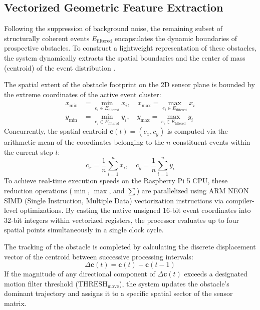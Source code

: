 \documentclass[conference]{IEEEtran}
\begin{document}
\subsection{Vectorized Geometric Feature Extraction}
Following the suppression of background noise, the remaining subset of structurally coherent events $E_{\text{filtered}}$ encapsulates the dynamic boundaries of prospective obstacles. To construct a lightweight representation of these obstacles, the system dynamically extracts the spatial boundaries and the center of mass (centroid) of the event distribution \cite{b14}.

The spatial extent of the obstacle footprint on the 2D sensor plane is bounded by the extreme coordinates of the active event cluster:
\begin{align}
    x_{\min} &= \min_{e_i \in E_{\text{filtered}}} x_i, \quad x_{\max} = \max_{e_i \in E_{\text{filtered}}} x_i \\
    y_{\min} &= \min_{e_i \in E_{\text{filtered}}} y_i, \quad y_{\max} = \max_{e_i \in E_{\text{filtered}}} y_i
\end{align}
Concurrently, the spatial centroid $\mathbf{c}(t) = (c_x, c_y)$ is computed via the arithmetic mean of the coordinates belonging to the $n$ constituent events within the current step $t$:
\begin{equation}
    c_x = \frac{1}{n} \sum_{i=1}^{n} x_i, \quad c_y = \frac{1}{n} \sum_{i=1}^{n} y_i
\end{equation}
To achieve real-time execution speeds on the Raspberry Pi 5 CPU, these reduction operations ($\min$, $\max$, and $\sum$) are parallelized using ARM NEON SIMD (Single Instruction, Multiple Data) vectorization instructions via compiler-level optimizations. By casting the native unsigned 16-bit event coordinates into 32-bit integers within vectorized registers, the processor evaluates up to four spatial points simultaneously in a single clock cycle. 

The tracking of the obstacle is completed by calculating the discrete displacement vector of the centroid between successive processing intervals:
\begin{equation}
    \Delta \mathbf{c}(t) = \mathbf{c}(t) - \mathbf{c}(t-1)
\end{equation}
If the magnitude of any directional component of $\Delta \mathbf{c}(t)$ exceeds a designated motion filter threshold ($\text{THRESH}_{\text{move}}$), the system updates the obstacle's dominant trajectory and assigns it to a specific spatial sector of the sensor matrix.
\end{document}
